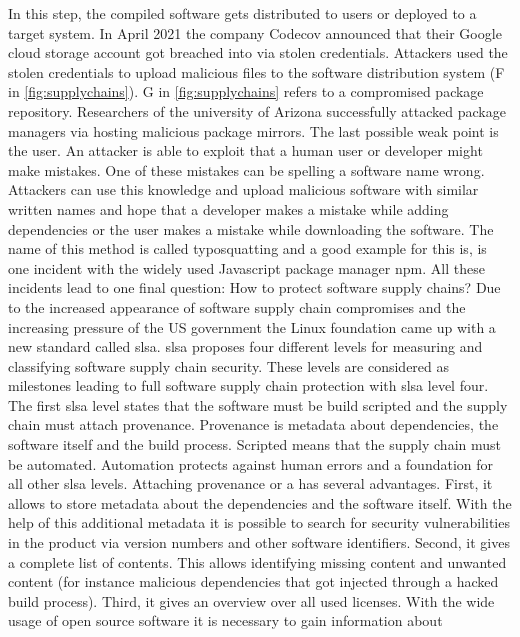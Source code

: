 \documentclass[titlepage]{report}
\begin{document}
In this step, the compiled software gets distributed to users or deployed to a target system. In April 2021 the company Codecov announced that their Google cloud storage account got breached into via stolen credentials\cite{Codecov}\cite{GoogleSecurityBlog}.
Attackers used the stolen credentials to upload malicious files to the software distribution system (F in \autoref{fig:supplychains}). G in \autoref{fig:supplychains} refers to a compromised package repository. Researchers of the university of Arizona
successfully attacked package managers via hosting malicious package mirrors\cite{cappos2008look}\cite{GoogleSecurityBlog}. The last possible weak point is the user. An attacker is able to exploit that a human user or developer might make mistakes.
One of these mistakes can be spelling a software name wrong. Attackers can use this knowledge and upload malicious software with similar written names and hope that a developer makes a mistake while adding dependencies or the user makes a mistake while downloading
the software. The name of this method is called typosquatting and a good example for this is, is one incident with the widely used Javascript package manager npm\cite{Typosquatting}\cite{GoogleSecurityBlog}. All these incidents lead to one final question:
How to protect software supply chains? Due to the increased appearance of software supply chain compromises and the increasing pressure of the US government the Linux foundation came up with a new standard called \gls{slsa}\cite{SLSA}.
\gls{slsa} proposes four different levels for measuring and classifying software supply chain security. These levels are considered as milestones leading to full software supply chain protection with \gls{slsa} level four. The first \gls{slsa} level
states that the software must be build scripted and the supply chain must attach provenance. Provenance is metadata about dependencies, the software itself and the build process\cite{SLSALevels}. Scripted means that the supply chain must be automated.
Automation protects against human errors and a foundation for all other \gls{slsa} levels. Attaching provenance or a   has several advantages. First, it allows to store metadata about the dependencies and the software itself.
With the help of this additional metadata it is possible to search for security vulnerabilities in the product via version numbers and other software identifiers\cite{pernpeintner2019you}. Second, it gives a complete list of contents. This allows identifying missing content
and unwanted content (for instance malicious dependencies that got injected through a hacked build process). Third, it gives an overview over all used licenses. With the wide usage of open source software it is necessary to gain information about
\end{document}
